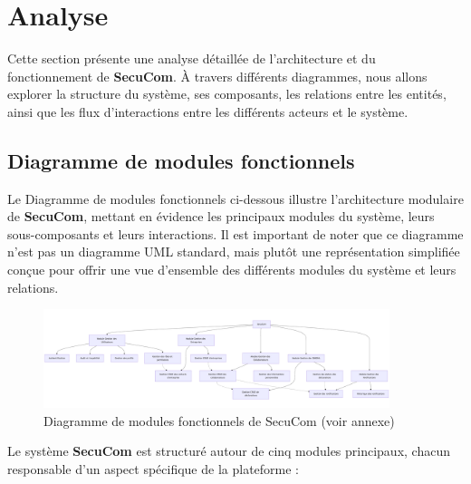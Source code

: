 \chapter{Analyse}

\noindent Cette section présente une analyse détaillée de l'architecture et du fonctionnement de \textbf{SecuCom}. À travers différents diagrammes, nous allons explorer la structure du système, ses composants, les relations entre les entités, ainsi que les flux d'interactions entre les différents acteurs et le système.

\section{Diagramme de modules fonctionnels}

\noindent Le Diagramme de modules fonctionnels ci-dessous illustre l'architecture modulaire de \textbf{SecuCom}, mettant en évidence les principaux modules du système, leurs sous-composants et leurs interactions. Il est important de noter que ce diagramme n'est pas un diagramme UML standard, mais plutôt une représentation simplifiée conçue pour offrir une vue d'ensemble des différents modules du système et leurs relations.

\begin{figure}[H]
\centering
\includegraphics[width=0.9\textwidth]{ComposantsDiagram.png}
\caption{Diagramme de modules fonctionnels de SecuCom (voir annexe)}
\end{figure}

\vspace{0.5cm}

\noindent Le système \textbf{SecuCom} est structuré autour de cinq modules principaux, chacun responsable d'un aspect spécifique de la plateforme :


